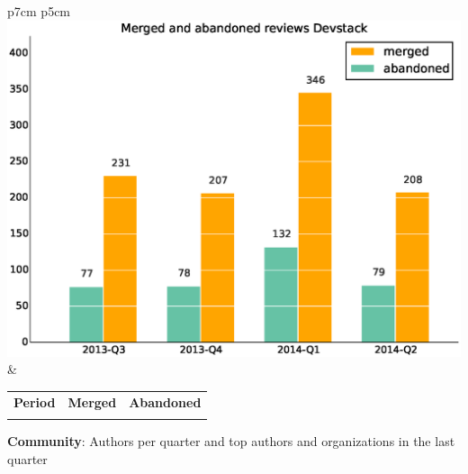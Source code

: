 \documentclass[a4wide,11pt]{report}
\begin{document}
\begin{tabular}{p{7cm} p{5cm}}
    \vspace{0pt} 
    \includegraphics[scale=.35]{figs/submitted_reviewsDevstack.eps}
    & 
    \vspace{0pt}
    \begin{tabular}{l|r|r|}%
    \bfseries Period & \bfseries Merged & \bfseries Abandoned %
    \csvreader[head to column names]{data/submitted_reviewsDevstack.csv}{}%
    {\\ & \merged & \abandoned}
    \end{tabular}
\end{tabular}


\textbf{Community}: Authors per quarter and top authors and organizations in the last quarter
\end{document}
